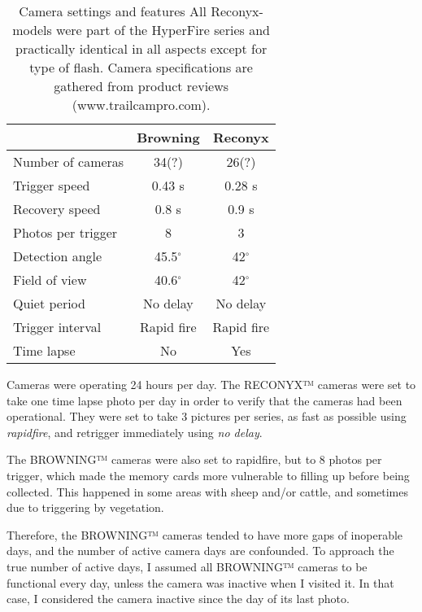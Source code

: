 \begin{table}[h]
\caption[Camera settings and features]
{Camera settings and features %
All Reconyx-models were part of the HyperFire series and practically identical in all aspects except for type of flash. Camera specifications are gathered from product reviews (www.trailcampro.com).}
\label{tab:cam_set}
\centering
\begin{tabular}{lcc}
\hline 
 & Browning & Reconyx \\ 
\hline 
Number of cameras 	& 34(?) 	& 26(?) \\  
Trigger speed 		& 0.43 s 	& 0.28 s \\ 
Recovery speed 		& 0.8 s 	& 0.9 s \\ 
Photos per trigger 	& 8 		& 3 \\  
Detection angle 	& 45.5$^{\circ}$ 	& 42$^{\circ}$ \\ 
Field of view 		& 40.6$^{\circ}$ 	& 42$^{\circ}$ \\  
Quiet period 		& No delay 	& No delay \\ 
Trigger interval	& Rapid fire & Rapid fire \\
Time lapse			& No	 	& Yes \\
\hline 
\end{tabular} 
\end{table}





Cameras were operating 24 hours per day. The RECONYX™ cameras were set to take one time lapse photo per day in order to verify that the cameras had been operational.
They were set to take 3 pictures per series, as fast as possible using \emph{rapidfire}, and retrigger immediately using \emph{no delay}.

The BROWNING™ cameras were also set to rapidfire, but to 8 photos per trigger, which made the memory cards more vulnerable to filling up before being collected. This happened in some areas with sheep and/or cattle, and sometimes due to triggering by vegetation.

Therefore, the BROWNING™ cameras tended to have more gaps of inoperable days, and the number of active camera days are confounded.
To approach the true number of active days, I assumed all BROWNING™ cameras to be functional every day, unless the camera was inactive when I visited it. In that case, I considered the camera inactive since the day of its last photo.




